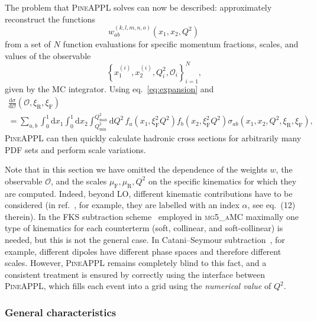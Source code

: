 The problem that \textsc{PineAPPL} solves can now be described: approximately reconstruct the functions
\begin{equation}
w_{ab}^{(k,l,m,n,o)} \left( x_1, x_2, Q^2 \right)
\label{eq:weight-map}
\end{equation}
from a set of $N$ function evaluations for specific momentum fractions, scales, and values of the observable
\begin{equation}
\left\{ x_1^{(i)}, x_2^{(i)}, Q^2_i, \mathcal{O}_i \right\}_{i=1}^N \text{,} \label{eq:phase-space-weights}
\end{equation}
given by the MC integrator.
Using eq.~\eqref{eq:expansion} and
\begin{multline}
\frac{\mathrm{d} \sigma}{\mathrm{d} \mathcal{O}} (\mathcal{O}, \xi_\mathrm{R}, \xi_\mathrm{F}) \\
= \sum_{a,b} \int_0^1 \mathrm{d} x_1 \int_0^1 \mathrm{d} x_2 \int_{Q^2_\mathrm{min}}^{Q^2_\mathrm{max}} \mathrm{d} Q^2 \, f_a (x_1, \xi_\mathrm{F}^2 Q^2) f_b (x_2, \xi_\mathrm{F}^2 Q^2) \sigma_{ab} (x_1, x_2, Q^2, \xi_\mathrm{R}, \xi_\mathrm{F}) \text{,}
\label{eq:pineappl-convolution}
\end{multline}
\textsc{PineAPPL} can then quickly calculate hadronic cross sections for arbitrarily many PDF sets and perform scale variations.

Note that in this section we have omitted the dependence of the weights $w$, the observable $\mathcal{O}$, and the scales $\mu_\mathrm{F}, \mu_\mathrm{R}, Q^2$ on the specific kinematics for which they are computed.
Indeed, beyond LO, different kinematic contributions have to be considered (in ref.~\cite{Bertone:2014zva}, for example, they are labelled with an index $\alpha$, see eq.~(12) therein).
In the FKS subtraction scheme~\cite{Frixione:1995ms,Frixione:1997np} employed in \textsc{mg5\_aMC} maximally one type of kinematics for each counterterm (soft, collinear, and soft-collinear) is needed, but this is not the general case.
In Catani--Seymour subtraction~\cite{Catani:1996jh,Catani:2002hc}, for example, different dipoles have different phase spaces and therefore different scales.
However, \textsc{PineAPPL} remains completely blind to this fact, and a consistent treatment is ensured by correctly using the interface between \textsc{PineAPPL}, which fills each event into a grid using the \emph{numerical value} of $Q^2$.

\subsubsection{General characteristics}

